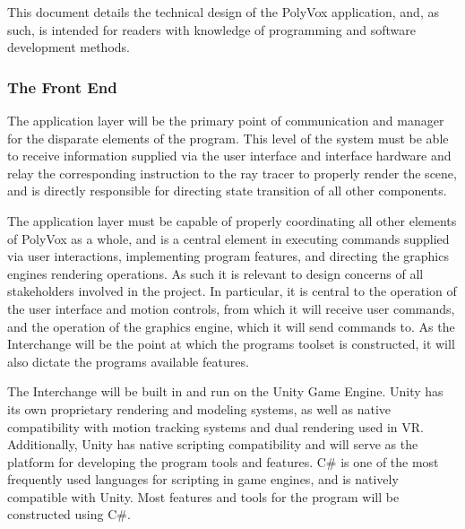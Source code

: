 \documentclass[onecolumn, draftclsnofoot,10pt, compsoc]{IEEEtran}
\newcounter{threesection}[subsubsection]
\newcounter{foursection}[threesection]
\begin{document}
This document details the technical design of the PolyVox application, and, as such, is intended for readers with knowledge of programming and software development methods. 

\subsubsection{The Front End}

The application layer will be the primary point of communication and manager for the disparate elements of the program.
This level of the system must be able to receive information supplied via the user interface and interface hardware and relay the corresponding instruction to the ray tracer to properly render the scene, and is directly responsible for directing state transition of all other components. 

The application layer must be capable of properly coordinating all other elements of PolyVox as a whole, and is a central element in executing commands supplied via user interactions, implementing program features, and directing the graphics engines rendering operations.
As such it is relevant to design concerns of all stakeholders involved in the project.
In particular, it is central to the operation of the user interface and motion controls, from which it will receive user commands, and the operation of the graphics engine, which it will send commands to.
As the Interchange will be the point at which the programs toolset is constructed, it will also dictate the programs available features.

 The Interchange will be built in and run on the Unity Game Engine.
Unity has its own proprietary rendering and modeling systems, as well as native compatibility with motion tracking systems and dual rendering used in VR.
Additionally, Unity has native scripting compatibility and will serve as the platform for developing the program tools and features.
 C\# is one of the most frequently used languages for scripting in game engines, and is natively compatible with Unity.
 Most features and tools for the program will be constructed using C\#. 
\end{document}
